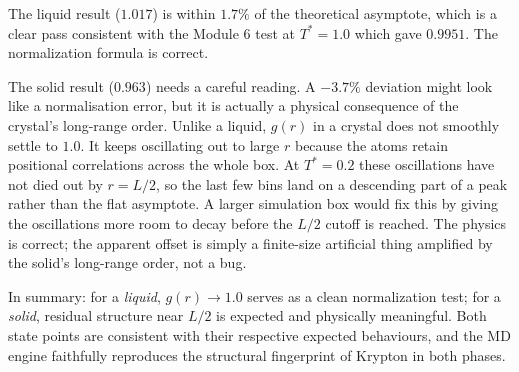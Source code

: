 The liquid result ($1.017$) is within $1.7\%$ of the theoretical asymptote, which is a clear pass consistent with the Module 6 test at $T^* = 1.0$ which gave $0.9951$. The normalization formula is correct.

The solid result ($0.963$) needs a careful reading. A $-3.7\%$ deviation might look like a normalisation error, but it is actually a physical consequence of the crystal's long-range order. Unlike a liquid, $g(r)$ in a crystal does not smoothly settle to $1.0$. It keeps oscillating out to large $r$ because the atoms retain positional correlations across the whole box. At $T^* = 0.2$ these oscillations have not died out by $r = L/2$, so the last few bins land on a descending part of a peak rather than the flat asymptote. A larger simulation box would fix this by giving the oscillations more room to decay before the $L/2$ cutoff is reached. The physics is correct; the apparent offset is simply a finite-size artificial thing amplified by the solid's long-range order, not a bug.

In summary: for a \emph{liquid}, $g(r) \to 1.0$ serves as a clean normalization test; for a \emph{solid}, residual structure near $L/2$ is expected and physically meaningful. Both state points are consistent with their respective expected behaviours, and the MD engine faithfully reproduces the structural fingerprint of Krypton in both phases.